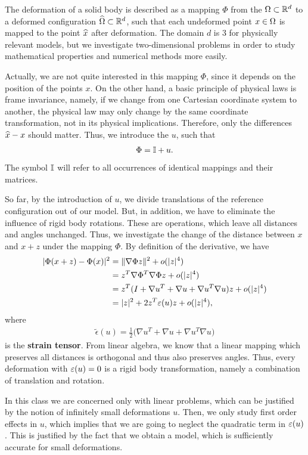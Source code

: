 \begin{intro}
  The deformation of a solid body is described as a mapping $\Phi$
  from the  $\Omega\subset \mathbb R^d$ to a
  deformed configuration $\widehat{\Omega} \subset \mathbb R^d$, such that
  each undeformed point $x\in\Omega$ is mapped to the point
  $\widehat{x}$ after deformation. The domain $d$ is 3 for physically
  relevant models, but we investigate two-dimensional problems in
  order to study mathematical properties and numerical methods more
  easily.

  Actually, we are not quite interested in this mapping $\Phi$, since
  it depends on the position of the points $x$. On the other hand, a
  basic principle of physical laws is frame invariance, namely, if we
  change from one Cartesian coordinate system to another, the physical
  law may only change by the same coordinate transformation, not in
  its physical implications. Therefore, only the differences
  $\widehat{x}-x$ should matter. Thus, we introduce the
   $u$, such that
  \begin{gather*}
    \Phi = \mathbb I + u.
  \end{gather*}
  The symbol $\mathbb I$ will refer to all occurrences of identical mappings
  and their matrices.

  So far, by the introduction of $u$, we divide translations of the
  reference configuration out of our model. But, in addition, we have
  to eliminate the influence of rigid body rotations. These are
  operations, which leave all distances and angles unchanged. Thus, we
  investigate the change of the distance between $x$ and $x+z$ under
  the mapping $\Phi$. By definition of the derivative, we have
  \begin{align*}
    \lvert\Phi(x+z) - \Phi(x)\rvert^2 &= \lVert\nabla\Phi z\rVert^2 + o(\lvert z\rvert^4)
    \\
                              &= z^T\nabla\Phi^T\nabla\Phi z + o(\lvert z\rvert^4)
    \\
    &= z^T(I + \nabla u^T + \nabla u + \nabla u^T \nabla u) z + o(\lvert z\rvert^4)
    \\
    &= \lvert z\rvert^2 + 2 z^T\varepsilon(u) z + o(\lvert z\rvert^4),
  \end{align*}
  where
  \begin{gather}
    \tilde\epsilon(u) = \tfrac12
    \bigl(\nabla u^T + \nabla u + \nabla u^T \nabla u\bigr)
  \end{gather}
  is the \textbf{strain tensor}. From linear algebra, we know that a
  linear mapping which preserves all distances is orthogonal and thus
  also preserves angles. Thus, every deformation with $\varepsilon(u)=0$
  is a rigid body transformation, namely a combination of translation
  and rotation.

  In this class we are concerned only with linear problems, which can
  be justified by the notion of infinitely small deformations
  $u$. Then, we only study first order effects in $u$, which implies
  that we are going to neglect the quadratic term in
  $\varepsilon(u)$. This is justified by the fact that we obtain a model,
  which is sufficiently accurate for small deformations.
\end{intro}


